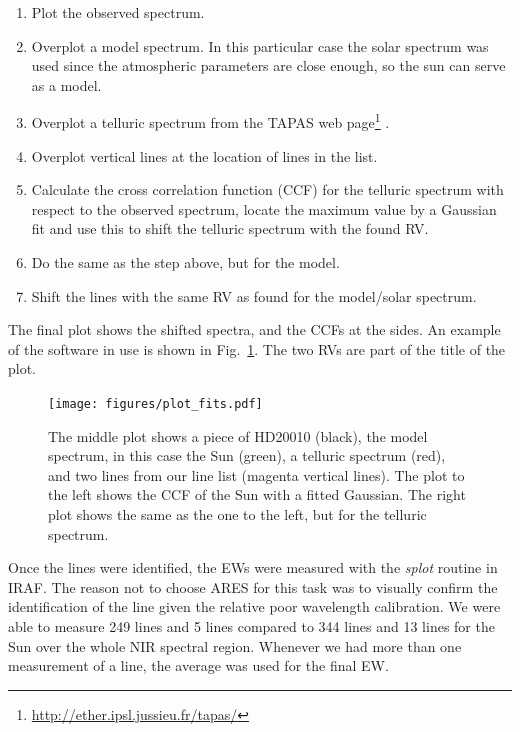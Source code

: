 \documentclass{aa}
\begin{document}
\begin{enumerate}
    \item Plot the observed spectrum.
    \item Overplot a model spectrum. In this particular case the solar spectrum was
        used since the atmospheric parameters are close enough, so the sun can
        serve as a model.
    \item Overplot a telluric spectrum from the TAPAS web
          page\footnote{\url{http://ether.ipsl.jussieu.fr/tapas/}} \citep{Bertaux2014}.
    \item Overplot vertical lines at the location of lines in the list.
    \item Calculate the cross correlation function (CCF) for the telluric spectrum
        with respect to the observed spectrum, locate the maximum value by a Gaussian fit
        and use this to shift the telluric spectrum with the found RV.
    \item Do the same as the step above, but for the model.
    \item Shift the lines with the same RV as found for the model/solar spectrum.
\end{enumerate}
The final plot shows the shifted spectra, and the CCFs at the sides. An
example of the software in use is shown in Fig.~\ref{fig:plot_fits}. The
two RVs are part of the title of the plot.

\begin{figure}[tbp!]
    \centering
    \texttt{[image: figures/plot\_fits.pdf]}
    \caption{The middle plot shows a piece of HD20010 (black), the model
    spectrum, in this case the Sun (green), a telluric spectrum (red),
    and two lines from our line list (magenta vertical lines). The
    plot to the left shows the CCF of the Sun with a fitted Gaussian.
    The right plot shows the same as the one to the left, but for the
    telluric spectrum.}
    \label{fig:plot_fits}
\end{figure}

Once the lines were identified, the EWs were measured with the
\emph{splot} routine in IRAF. The reason not to choose ARES for this
task was to visually confirm the identification of the line given the
relative poor wavelength calibration. We were able to measure 249
 lines and 5  lines compared to 344 
lines and 13  lines for the Sun over the whole NIR spectral
region. Whenever we had more than one measurement of a line, the average
was used for the final EW.
\end{document}
